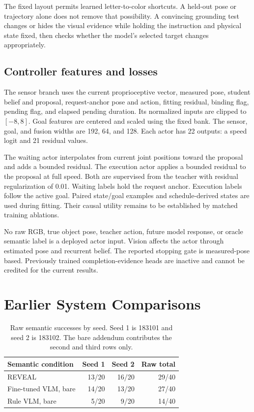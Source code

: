 The fixed layout permits learned letter-to-color shortcuts. A held-out pose or trajectory alone does not remove that possibility. A convincing grounding test changes or hides the visual evidence while holding the instruction and physical state fixed, then checks whether the model's selected target changes appropriately.

\subsection{Controller features and losses}
The sensor branch uses the current proprioceptive vector, measured pose, student belief and proposal, request-anchor pose and action, fitting residual, binding flag, pending flag, and elapsed pending duration. Its normalized inputs are clipped to $[-8,8]$. Goal features are centered and scaled using the fixed bank. The sensor, goal, and fusion widths are 192, 64, and 128. Each actor has 22 outputs: a speed logit and 21 residual values.

The waiting actor interpolates from current joint positions toward the proposal and adds a bounded residual. The execution actor applies a bounded residual to the proposal at full speed. Both are supervised from the teacher with residual regularization of 0.01. Waiting labels hold the request anchor. Execution labels follow the active goal. Paired state/goal examples and schedule-derived states are used during fitting. Their causal utility remains to be established by matched training ablations.

No raw RGB, true object pose, teacher action, future model response, or oracle semantic label is a deployed actor input. Vision affects the actor through estimated pose and recurrent belief. The reported stopping gate is measured-pose based. Previously trained completion-evidence heads are inactive and cannot be credited for the current results.

\section{Earlier System Comparisons}
\begin{table}[h]
\centering\small
\setlength{\tabcolsep}{3pt}
\begin{tabular}{lrrr}
\toprule
Semantic condition & Seed 1 & Seed 2 & Raw total\\
\midrule
REVEAL & 13/20 & 16/20 & 29/40\\
Fine-tuned VLM, bare & 14/20 & 13/20 & 27/40\\
Rule VLM, bare & 5/20 & 9/20 & 14/40\\
\bottomrule
\end{tabular}
\caption{Raw semantic successes by seed. Seed 1 is 183101 and seed 2 is 183102. The bare addendum contributes the second and third rows only.}
\end{table}

